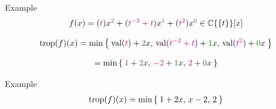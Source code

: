 \documentclass{beamer}
\DeclareMathOperator{\val}{val}
\DeclareMathOperator{\trop}{trop}
\newcommand{\C}{\ensuremath{\mathbb{C}}}
\newcommand{\PS}{\ensuremath{ \C \{\{ t \} \} }}
\begin{document}
\begin{frame}{Example}
    \begin{align}
        f(x) = 
        ({\textcolor{magenta}{t}}) x^{\textcolor{grn}{2}} +
        ({\textcolor{magenta}{t^{-2} + t}}) x^{\textcolor{grn}{1}} +
        ({\textcolor{magenta}{t^2}}) x^{\textcolor{grn}{0}} 
        \in \PS [x]
    \end{align}

    \pause
    \begin{align}
        \trop(f)(x)
        = \min \Set{ 
            \val({\textcolor{magenta}{t}}) + {\textcolor{grn}{2}}x, 
            \, \val({\textcolor{magenta}{t^{-2} + t}}) + {\textcolor{grn}{1}} x, 
            \, \val({\textcolor{magenta}{t^2}}) + {\textcolor{grn}{0}} x }
    \end{align}

    \pause
    \begin{align}
        = \min \Set{ 
            {\textcolor{magenta}{1}} + {\textcolor{grn}{2}}x, 
            \, {\textcolor{magenta}{-2}} + {\textcolor{grn}{1}}x, 
            \, {\textcolor{magenta}{2}} + {\textcolor{grn}{0}}x }
    \end{align}
\end{frame}

\begin{frame}{Example}
\begin{align}
    \trop(f)(x) = \min \Set{ 
                1 + 2x, \,
                x - 2, \, 
                2 }
\end{align}
\begin{adjustbox}{max totalsize={\textwidth}{.7\textheight},center}
    \centering
\end{adjustbox}
\end{frame}
\end{document}
